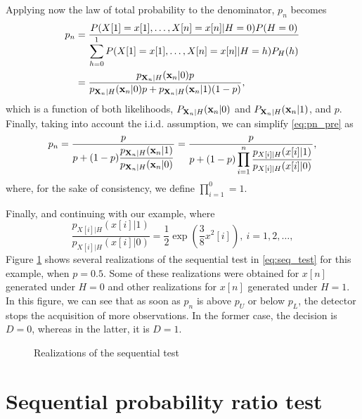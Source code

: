 Applying now the law of total probability to the denominator, $p_n$ becomes
\begin{align}
	p_n &= \frac{P(X[1] = x[1], \ldots, X[n] = x[n] | H = 0) P(H = 0)}{\displaystyle \sum_{h = 0}^{1} P(X[1] = x[1], \ldots, X[n] = x[n] | H = h) P_H(h)} \nonumber \\ &= 
	\frac{p_{\mathbf{X}_n | H}({\mathbf x}_n | 0) p}{p_{\mathbf{X}_n | H}({\mathbf x}_n | 0) p + p_{\mathbf{X}_n | H}({\mathbf x}_n | 1) (1 - p)}, \label{eq:pn_pre}
\end{align}
which is a function of both likelihoods, $P_{\mathbf{X}_n | H}({\mathbf x}_n | 0)$ and $P_{\mathbf{X}_n | H}({\mathbf x}_n | 1)$, and $p$. Finally, taking into account the i.i.d. assumption, we can simplify \eqref{eq:pn_pre} as
\begin{equation}
	\label{eq:pn}
	p_n = \frac{p}{\displaystyle p +  (1 - p) \frac{p_{\mathbf{X}_n | H}({\mathbf x}_n | 1)}{p_{\mathbf{X}_n | H}({\mathbf x}_n | 0)}} = \frac{p}{\displaystyle p +  (1 - p) \prod_{i = 1}^{n} \frac{p_{X[i] | H}(x[i] | 1)}{p_{X[i] | H}(x[i] | 0)}},
\end{equation}
where, for the sake of consistency, we define $\prod_{i = 1}^{0} = 1$.

Finally, and continuing with our example, where
\begin{equation*}
	\frac{p_{X[i] | H}(x[i] | 1)}{p_{X[i] | H}(x[i] | 0)} = \frac{1}{2} \exp \left(\frac{3 }{8} x^2[i] \right), \ i = 1, 2, \ldots,
\end{equation*}
Figure \ref{fig:seq_test_realizations} shows several realizations of the sequential test in \eqref{eq:seq_test} for this example, when $p = 0.5$. Some of these realizations were obtained for $x[n]$ generated under $H = 0$ and other realizations for  $x[n]$ generated under $H = 1$. In this figure, we can see that as soon as $p_n$ is above $p_U$ or below $p_L$, the detector stops the acquisition of more observations. In the former case, the decision is $D = 0$, whereas in the latter, it is $D = 1$.
\begin{figure}[t]
	\begin{center}
		
	\end{center}
	\caption{Realizations of the sequential test}
	\label{fig:seq_test_realizations}
\end{figure}

\section{Sequential probability ratio test}

